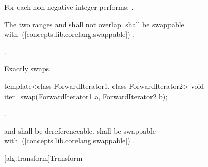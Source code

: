 \begin{itemdescr}
\pnum
\effects
{}
For each non-negative integer 
performs:
.

\pnum
\requires
The two ranges 
and
\brk{}
shall not overlap.
 shall be swappable with~(\ref{concepts.lib.corelang.swappable})
.

\pnum
\returns
{}.

\pnum
\complexity
Exactly
swaps.
\end{itemdescr}

\begin{removedblock}
%
\begin{itemdecl}
template<class ForwardIterator1, class ForwardIterator2>
  void iter_swap(ForwardIterator1 a, ForwardIterator2 b);
\end{itemdecl}


\begin{itemdescr}
\pnum
\effects
{}.

\pnum
\requires
{} and  shall be dereferenceable.  shall be
swappable with~(\ref{concepts.lib.corelang.swappable}) .
\end{itemdescr}
\end{removedblock}

[alg.transform]{Transform}

